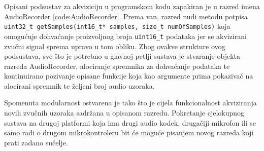 Opisani podsustav za akviziciju u programskom kodu zapakiran je u razred imena 
AudioRecorder \ref{code:AudioRecorder}. Prema van, razred nudi metodu potpisa
\texttt{uint32\_t getSamples(int16\_t* samples, size\_t numOfSamples)} koja 
omogućuje dohvaćanje proizvoljnog broja \texttt{uint16\_t} podataka jer 
se akvizirani zvučni signal sprema upravo u tom obliku. Zbog ovakve strukture
ovog podsustava, sve što je potrebno u glavnoj petlji sustava je stvaranje objekta
razreda AudioRecorder, alociranje spremnika za dohvaćanje podataka te kontinuirano
pozivanje opisane funkcije koja kao argumente prima pokazivač na alocirani spremnik
te željeni broj audio uzoraka.

Spomenuta modularnost ostvarena je tako što je cijela funkcionalnost akviziranja
novih zvučnih uzoraka sadržana u opisanom razredu. Pokretanje cjelokupnog sustava
na drugoj platformi koja ima drugi audio kodek, drugačiji mikrofon ili se samo 
radi o drugom mikrokontroleru bit će moguće pisanjem novog razreda koji
prati zadano sučelje.